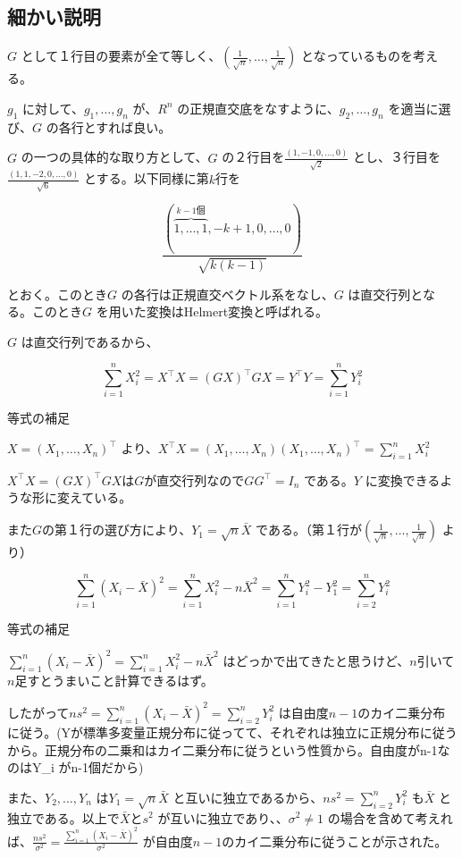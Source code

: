 \documentclass[
  letterpaper,
  DIV=11,
  numbers=noendperiod,
  oneside]{scrartcl}
\begin{document}
\subsection{細かい説明}\label{ux7d30ux304bux3044ux8aacux660e}

\(G\)
として１行目の要素が全て等しく、\((\frac{1}{\sqrt{n}}, \dots,\frac{1}{\sqrt{n}})\)
となっているものを考える。

\(g_1\) に対して、\(g_1, \dots,g_n\) が、\(R^n\)
の正規直交底をなすように、\(g_2, \dots,g_n\) を適当に選び、\(G\)
の各行とすれば良い。

\(G\) の一つの具体的な取り方として、\(G\)
の２行目を\(\frac{(1,-1,0, \dots,0)}{\sqrt{2}}\)
とし、３行目を\(\frac{(1,1,-2,0, \dots,0)}{\sqrt{6}}\)
とする。以下同様に第\(k\)行を

\[
\frac{\left( \overbrace{1, \dots, 1}^{k-1 \text{個}}, -k + 1, 0, \dots, 0 \right)}{\sqrt{k(k-1)}}
\]

とおく。このとき\(G\) の各行は正規直交ベクトル系をなし、\(G\)
は直交行列となる。このとき\(G\) を用いた変換はHelmert変換と呼ばれる。

\(G\) は直交行列であるから、

\[
\sum_{i=1}^n X_i^2 = X^{\top}X=(GX)^{\top}GX = Y^{\top} Y = \sum_{i=1}^n Y_i^2
\]

等式の補足

\(X = (X_1, \dots,X_n)^{\top}\)
より、\(X^{\top}X = (X_1, \dots,X_n)(X_1, \dots,X_n)^{\top}=\sum_{i=1}^n X_i^2\)

\(X^{\top}X=(GX)^{\top}GX\)は\(G\)が直交行列なので\(GG^{\top}=I_n\)
である。\(Y\) に変換できるような形に変えている。

また\(G\)の第１行の選び方により、\(Y_1=\sqrt{n}\bar{X}\)
である。（第１行が\((\frac{1}{\sqrt{n}}, \dots,\frac{1}{\sqrt{n}})\)
より）

\[
\sum_{i=1}^n (X_i - \bar{X})^2= \sum_{i=1}^n X_i^2 - n \bar{X}^2 = \sum_{i=1}^n Y_i^2 - Y_1^2 = \sum_{i=2}^n Y_i^2
\]

等式の補足

\(\sum_{i=1}^n (X_i - \bar{X})^2= \sum_{i=1}^n X_i^2 - n \bar{X}^2\)
はどっかで出てきたと思うけど、\(n\)引いて\(n\)足すとうまいこと計算できるはず。

したがって\(ns^2=\sum_{i=1}^n (X_i - \bar{X})^2= \sum_{i=2}^n Y_i^2\)
は自由度\(n-1\)のカイ二乗分布に従う。(Yが標準多変量正規分布に従ってて、それぞれは独立に正規分布に従うから。正規分布の二乗和はカイ二乗分布に従うという性質から。自由度がn-1なのはY\_i
がn-1個だから)

また、\(Y_2, \dots, Y_n\) は\(Y_1=\sqrt{n}\bar{X}\)
と互いに独立であるから、\(ns^2= \sum_{i=2}^n Y_i^2\) も\(\bar{X}\)
と独立である。以上で\(\bar{X}\)と\(s^2\)
が互いに独立であり、、\(\sigma^2 \ne 1\)
の場合を含めて考えれば、\(\frac{ns^2}{\sigma^2}=\frac{\sum_{i=1}^n (X_i - \bar{X})^2}{\sigma^2}\)
が自由度\(n-1\)のカイ二乗分布に従うことが示された。
\end{document}
